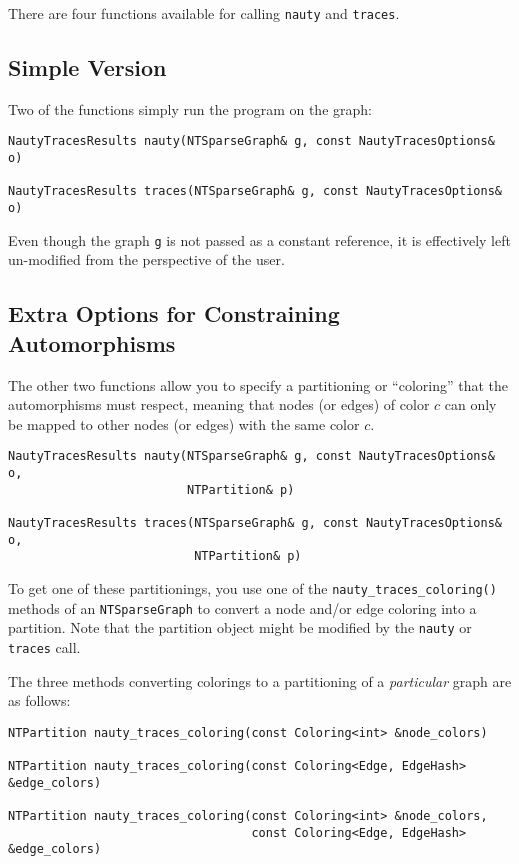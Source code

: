 \documentclass{article}
\begin{document}
There are four functions available for calling \verb|nauty| and \verb|traces|. 

\subsection{Simple Version}

Two of the functions simply run the program on the graph:

\begin{verbatim}
NautyTracesResults nauty(NTSparseGraph& g, const NautyTracesOptions& o)

NautyTracesResults traces(NTSparseGraph& g, const NautyTracesOptions& o)
\end{verbatim}

Even though the graph \verb|g| is not passed as a constant reference, it is effectively left un-modified from the perspective of the user.

\subsection{Extra Options for Constraining Automorphisms}

The other two functions allow you to specify a partitioning or ``coloring'' that the automorphisms must respect, meaning that nodes (or edges) of color $c$ can only be mapped to other nodes (or edges) with the same color $c$.

\begin{verbatim}
NautyTracesResults nauty(NTSparseGraph& g, const NautyTracesOptions& o,
                         NTPartition& p)

NautyTracesResults traces(NTSparseGraph& g, const NautyTracesOptions& o,
                          NTPartition& p)
\end{verbatim}

To get one of these partitionings, you use one of the \verb|nauty_traces_coloring()| methods of an \verb|NTSparseGraph| to convert a node and/or edge coloring into a partition. Note that the partition object might be modified by the \verb|nauty| or \verb|traces| call.

The three methods converting colorings to a partitioning of a \emph{particular} graph are as follows:

\begin{verbatim}
NTPartition nauty_traces_coloring(const Coloring<int> &node_colors)

NTPartition nauty_traces_coloring(const Coloring<Edge, EdgeHash> &edge_colors)

NTPartition nauty_traces_coloring(const Coloring<int> &node_colors,
                                  const Coloring<Edge, EdgeHash> &edge_colors)
\end{verbatim}
\end{document}
